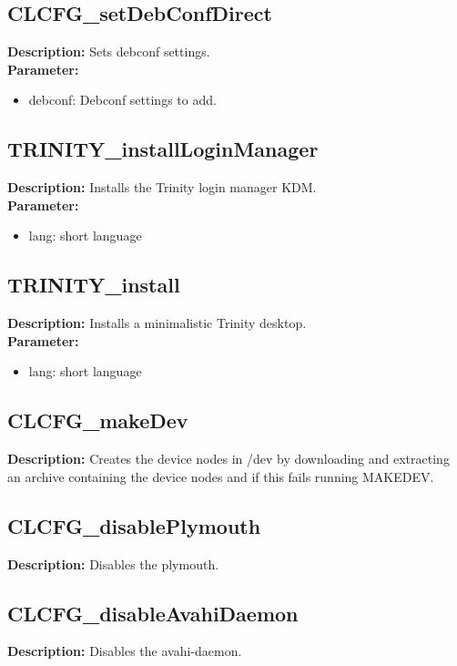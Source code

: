 \subsection{CLCFG\_setDebConfDirect}
\textbf{Description:} Sets debconf settings.\\
\textbf{Parameter:}
\begin{itemize}
\item debconf: Debconf settings to add.
\end{itemize}

\subsection{TRINITY\_installLoginManager}
\textbf{Description:} Installs the Trinity login manager KDM.\\
\textbf{Parameter:}
\begin{itemize}
\item lang: short language
\end{itemize}

\subsection{TRINITY\_install}
\textbf{Description:} Installs a minimalistic Trinity desktop.\\
\textbf{Parameter:}
\begin{itemize}
\item lang: short language
\end{itemize}

\subsection{CLCFG\_makeDev}
\textbf{Description:} Creates the device nodes in /dev by downloading and extracting an archive containing the device nodes and if this fails running MAKEDEV.\\

\subsection{CLCFG\_disablePlymouth}
\textbf{Description:} Disables the plymouth.\\

\subsection{CLCFG\_disableAvahiDaemon}
\textbf{Description:} Disables the avahi-daemon.\\

